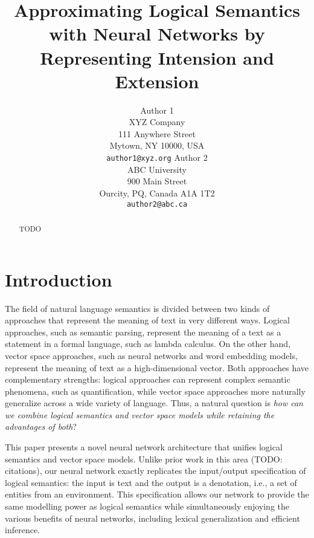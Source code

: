 \documentclass[11pt,letterpaper]{article}
\title{Approximating Logical Semantics with Neural Networks by \\ Representing Intension and Extension}
\author{Author 1\\
	    XYZ Company\\
	    111 Anywhere Street\\
	    Mytown, NY 10000, USA\\
	    {\tt author1@xyz.org}
	  \And
	Author 2\\
  	ABC University\\
  	900 Main Street\\
  	Ourcity, PQ, Canada A1A 1T2\\
  {\tt author2@abc.ca}}
\date{}
\begin{document}
\maketitle
\begin{abstract}
TODO
\end{abstract}

\section{Introduction}

The field of natural language semantics is divided between two kinds
of approaches that represent the meaning of text in very different
ways. Logical approaches, such as semantic parsing, represent the
meaning of a text as a statement in a formal language, such as lambda
calculus. On the other hand, vector space approaches, such as neural
networks and word embedding models, represent the meaning of text as a
high-dimensional vector. Both approaches have complementary strengths:
logical approaches can represent complex semantic phenomena, such as
quantification, while vector space approaches more naturally
generalize across a wide variety of language. Thus, a natural question
is \emph{how can we combine logical semantics and vector space models
  while retaining the advantages of both}?



This paper presents a novel neural network architecture that unifies
logical semantics and vector space models. Unlike prior work in this
area (TODO: citations), our neural network exactly replicates the
input/output specification of logical semantics: the input is text and
the output is a denotation, i.e., a set of entities from an
environment. This specification allows our network to provide the same
modelling power as logical semantics while simultaneously enjoying the
various benefits of neural networks, including lexical generalization
and efficient inference.
\end{document}

